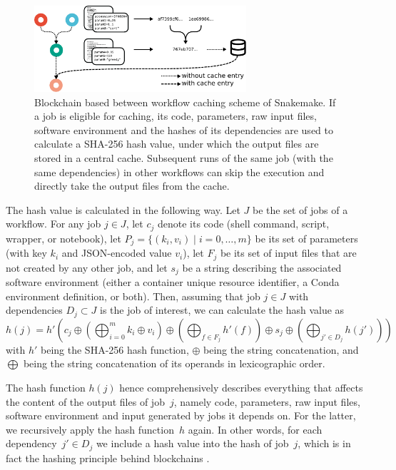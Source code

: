 \documentclass[parskip=half]{scrartcl}
\begin{document}
\begin{figure}
	\centering
	\includegraphics[width=0.7\textwidth]{caching.pdf}
	\caption{
		Blockchain based between workflow caching scheme of Snakemake.
		If a job is eligible for caching, its code, parameters, raw input files, software environment and the hashes of its dependencies are used to calculate a SHA-256 hash value, under which the output files are stored in a central cache.
		Subsequent runs of the same job (with the same dependencies) in other workflows can skip the execution and directly take the output files from the cache.
	}
	\label{fig:caching}
\end{figure}

The hash value is calculated in the following way.
Let $J$ be the set of jobs of a workflow.
For any job $j \in J$, let $c_j$ denote its code (shell command, script, wrapper, or notebook), let $P_j = \{(k_i, v_i) \mid i=0,\dots,m\}$ be its set of parameters (with key $k_i$ and JSON-encoded value $v_i$), let $F_j$ be its set of input files that are not created by any other job, and let $s_j$ be a string describing the associated software environment (either a container unique resource identifier, a Conda environment definition, or both).
Then, assuming that job $j \in J$ with dependencies $D_j \subset J$ is the job of interest, we can calculate the hash value as $$ h(j) = h'\left( c_j \oplus \left(\bigoplus_{i=0}^m k_i \oplus v_i \right) \oplus \left( \bigoplus_{f \in F_j} h'(f) \right) \oplus s_j \oplus \left( \bigoplus_{j' \in D_j} h(j') \right) \right) $$ with $h'$ being the SHA-256 \parencite{Handschuh} hash function, $\oplus$ being the string concatenation, and $\bigoplus$ being the string concatenation of its operands in lexicographic order.

The hash function $h(j)$ hence comprehensively describes everything that affects the content of the output files of job~\(j\), namely code, parameters, raw input files, software environment and input generated by jobs it depends on.
For the latter, we recursively apply the hash function~\(h\) again.
In other words, for each dependency~\(j' \in D_j\) we include a hash value into the hash of job~\(j\), which is in fact the hashing principle behind blockchains \parencite{narayanan_bitcoin_2016}.
\end{document}
